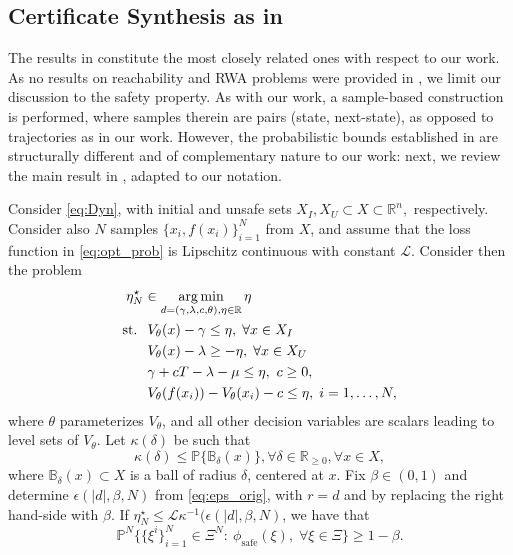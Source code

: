 \subsection{Certificate Synthesis as in \cite{DBLP:journals/tac/NejatiLJSZ23}}
The results in \cite{DBLP:journals/tac/NejatiLJSZ23} constitute the most closely related ones with respect to our work. 
As no results on reachability and RWA problems were provided in \cite{DBLP:journals/tac/NejatiLJSZ23}, we limit our discussion to the safety property. 
As with our work, a sample-based construction is performed, where samples therein are pairs (state, next-state), as opposed to trajectories as in our work. However, the probabilistic bounds established in \cite{DBLP:journals/tac/NejatiLJSZ23} are structurally different and of complementary nature to our work: next, we review the main result in \cite{DBLP:journals/tac/NejatiLJSZ23}, adapted to our notation.

\begin{thm}
    Consider \eqref{eq:Dyn}, with initial and unsafe sets $X_I,X_U\subset X \subset \mathbb{R}^n,$ respectively.
    Consider also $N$ samples $\{x_i, f(x_i)\}_{i=1}^N$ from $X$, and assume that the loss function in \eqref{eq:opt_prob} is Lipschitz continuous with constant $\mathcal{L}$.
    Consider then the problem
        \begin{align}
            \eta^\star_N &\in \operatorname*{arg\,min}_{d = (\gamma,\lambda,c,\theta),\eta \in \mathbb{R}}\eta \nonumber \\
            \text{st. }&\; V_\theta(x)-\gamma \leq \eta, \; \forall x \in X_I \nonumber \\
            &\; V_\theta(x)-\lambda \geq -\eta, \; \forall x \in X_U \nonumber \\
            &\; \gamma + cT - \lambda - \mu \leq \eta, ~ c \geq 0, \nonumber \\
            &\; V_\theta(f(x_i)) - V_\theta(x_i) -c \leq \eta, \; i=1,\dots,N,  
        \end{align}
        where $\theta$ parameterizes $V_\theta$, and all other decision variables are scalars leading to level sets of $V_\theta$. Let $\kappa(\delta)$ be such that
    \begin{equation}
	    \label{eq:ball}
        \kappa(\delta) \leq \mathbb{P}\{\mathbb{B}_\delta(x)\}, \forall \delta \in \mathbb{R}_{\geq 0}, \forall x \in X,
    \end{equation}
    where $\mathbb{B}_\delta(x) \subset X$ is a ball of radius $\delta$, centered at $x$.
    Fix $\beta \in (0,1)$ and
    determine $\epsilon(|d|,\beta,N)$ from \eqref{eq:eps_orig}, with $r = d$ and by replacing the right hand-side with $\beta$.
    If $\eta^\star_N \leq \mathcal{L} \kappa^{-1}(\epsilon(|d|,\beta,N)$, we have that
    \begin{equation}
	    \mathbb{P}^N\big \{ \{\xi^i\}_{i=1}^N \in \Xi^N:~\phi_{\mathrm{safe}}(\xi), \; \forall \xi \in \Xi  \big\} \geq 1-\beta.
    \end{equation}
\end{thm}

